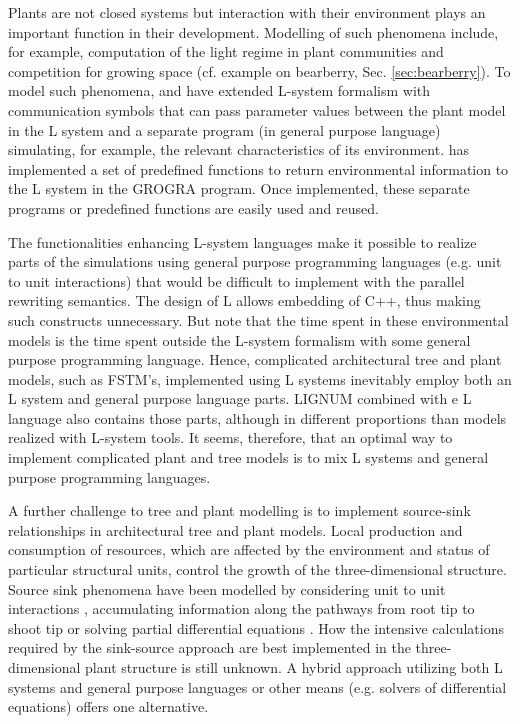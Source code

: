 Plants are  not closed systems but interaction  with their environment
plays an  important function in their development.   Modelling of such
phenomena  include, for example,  computation of  the light  regime in
plant communities  and competition for growing space  (cf.  example on
bearberry,  Sec.   \ref{sec:bearberry}).   To  model  such  phenomena,
\citet{mech:97} and  \citet{mech:96} have extended  L-system formalism
with communication symbols that  can pass parameter values between the
plant model in the L system and a separate program (in general purpose
language) simulating, for example, the relevant characteristics of its
environment.   \citet{kurth:94} has  implemented a  set  of predefined
functions to return  environmental information to the L  system in the
GROGRA  program.    Once  implemented,  these   separate  programs  or
predefined functions are easily used and reused.

The functionalities  enhancing L-system languages make  it possible to
realize  parts of  the simulations  using general  purpose programming
languages (e.g.  unit to unit interactions) that would be difficult to
implement  with the  parallel rewriting  semantics.  The  design  of L
allows embedding of C++, thus making such constructs unnecessary.  But
note that  the time  spent in these  environmental models is  the time
spent  outside  the  L-system  formalism  with  some  general  purpose
programming language.  Hence, complicated architectural tree and plant
models, such as FSTM's,  implemented using L systems inevitably employ
both an L system and  general purpose language parts.  LIGNUM combined
with e  L language  also contains those  parts, although  in different
proportions  than  models realized  with  L-system  tools.  It  seems,
therefore, that an optimal way to implement complicated plant and tree
models is to mix L systems and general purpose programming languages.
 
A  further challenge  to  tree  and plant  modelling  is to  implement
source-sink  relationships  in architectural  tree  and plant  models.
Local production  and consumption of resources, which  are affected by
the environment and status of particular structural units, control the
growth of the three-dimensional structure.  Source sink phenomena have
been   modelled    by   considering   unit    to   unit   interactions
\citep{balandier:00}, accumulating information along the pathways from
root  tip   to  shoot  tip  \citep{dereffye:97}   or  solving  partial
differential  equations  \citep{deleuze:97,  palovaara:03}.   How  the
intensive calculations  required by the sink-source  approach are best
implemented in the three-dimensional plant structure is still unknown.
A  hybrid  approach  utilizing  both  L systems  and  general  purpose
languages  or other  means (e.g.   solvers of  differential equations)
offers one alternative.

